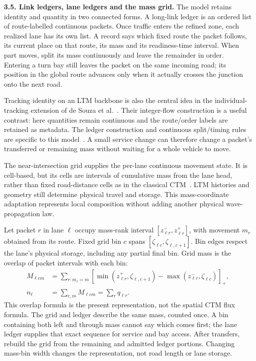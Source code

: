 \documentclass[10pt,a4paper]{article}
\newenvironment{revision}{\begingroup\color{revisionred}}{\par\endgroup}
\begin{document}
\begin{revision}
\textbf{3.5. Link ledgers, lane ledgers and the mass grid.}
The model retains identity and quantity in two connected forms.
A long-link ledger is an ordered list of route-labelled continuous
packets. Once traffic enters the refined zone, each realized lane has
its own list. A record says which fixed route the packet follows, its
current place on that route, its mass and its readiness-time interval.
When part moves, split its mass continuously and leave the remainder
in order. Entering a turn bay still leaves the packet on the same incoming road;
its position in the global route advances only when it actually crosses
the junction onto the next road.

Tracking identity on an LTM backbone is also the central idea in the
individual-tracking extension of de Souza et al.~\cite{tracking}.
Their integer-flow construction is a useful contrast: here quantities
remain continuous and the route/order labels are retained as metadata.
The ledger construction and continuous split/timing rules are specific
to this model~\cite{m1}. A small service change can therefore change a
packet's transferred or remaining mass without waiting for a whole
vehicle to move.

The near-intersection grid supplies the per-lane continuous movement
state. It is cell-based, but its cells are intervals of cumulative mass
from the lane head, rather than fixed road-distance cells as in the
classical CTM~\cite{ctm}. LTM histories and geometry still determine
physical travel and storage. This mass-coordinate adaptation represents
local composition without adding another physical wave-propagation law.

Let packet $r$ in lane $\ell$ occupy mass-rank interval
$[z^-_{\ell r},z^+_{\ell r}]$, with movement $m_r$ obtained from its
route. Fixed grid bin $c$ spans
$[\zeta_{\ell c},\zeta_{\ell,c+1}]$. Bin edges respect the lane's
physical storage, including any partial final bin. Grid mass is the
overlap of packet intervals with each bin:
\begin{equation}
 \begin{aligned}
 M_{\ell cm}&=\sum_{r:m_r=m}
 \left[\min(z^+_{\ell r},\zeta_{\ell,c+1})
             -\max(z^-_{\ell r},\zeta_{\ell c})\right]_+,\\
 n_\ell&=\sum_{c,m}M_{\ell cm}=\sum_r q_{\ell r}.
 \end{aligned}
 \label{eq:compact-grid}
\end{equation}
This overlap formula is the present representation, not the spatial
CTM flux formula. The grid and ledger describe the same mass, counted
once. A bin containing both left and through mass cannot say which
comes first; the lane ledger supplies that exact sequence for service
and bay access. After transfers, rebuild the grid from the remaining
and admitted ledger portions. Changing mass-bin width changes the representation, not road length
or lane storage.
\end{revision}
\end{document}
